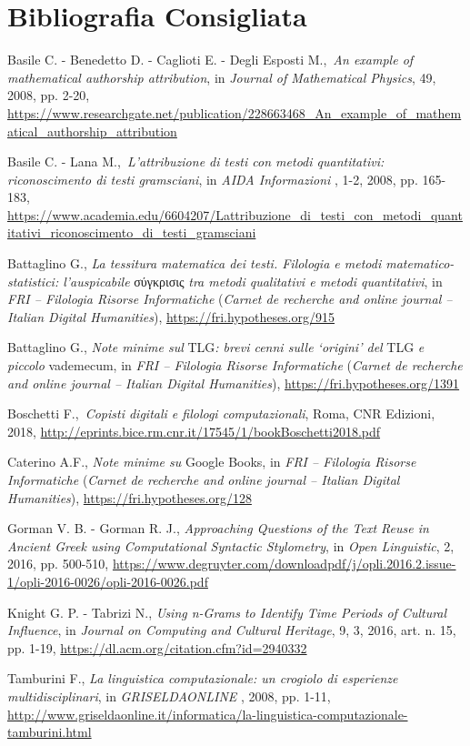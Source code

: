 \section*{Bibliografia Consigliata}
{\parindent0pt 
Basile C. - Benedetto D. - Caglioti E. - Degli Esposti M.,~\emph{An
example of mathematical authorship attribution}, in \emph{Journal of
Mathematical Physics}, 49, 2008, pp. 2-20,
\url{https://www.researchgate.net/publication/228663468_An_example_of_mathematical_authorship_attribution}

Basile C. - Lana M.,~\emph{L'attribuzione di testi con metodi
quantitativi: riconoscimento di testi gramsciani}, in \emph{AIDA
Informazioni} , 1-2, 2008, pp. 165-183,
\url{https://www.academia.edu/6604207/Lattribuzione_di_testi_con_metodi_quantitativi_riconoscimento_di_testi_gramsciani}

Battaglino G., \emph{La tessitura matematica dei testi. Filologia e
metodi matematico-statistici: l'auspicabile} σύγκρισις \emph{tra metodi
qualitativi e metodi quantitativi}, in \emph{FRI -- Filologia Risorse
Informatiche} (\emph{Carnet de recherche and online journal -- Italian
Digital Humanities}),
\url{https://fri.hypotheses.org/915}

Battaglino G., \emph{Note minime sul} TLG\emph{: brevi cenni sulle
`origini' del} TLG \emph{e piccolo} vademecum, in \emph{FRI -- Filologia
Risorse Informatiche} (\emph{Carnet de recherche and online journal --
Italian Digital Humanities}),
\url{https://fri.hypotheses.org/1391}

Boschetti F.,~\emph{Copisti digitali e filologi computazionali}, Roma,
CNR Edizioni, 2018,
\url{http://eprints.bice.rm.cnr.it/17545/1/bookBoschetti2018.pdf} 

Caterino A.F., \emph{Note minime su} Google Books, in \emph{FRI --
Filologia Risorse Informatiche} (\emph{Carnet de recherche and online
journal -- Italian Digital Humanities}),
\url{https://fri.hypotheses.org/128}

Gorman V. B. - Gorman R. J., \emph{Approaching Questions of the Text
Reuse in Ancient Greek using Computational Syntactic Stylometry}, in
\emph{Open Linguistic}, 2, 2016, pp. 500-510,
\url{https://www.degruyter.com/downloadpdf/j/opli.2016.2.issue-1/opli-2016-0026/opli-2016-0026.pdf}

Knight G. P. - Tabrizi N., \emph{Using n-Grams to Identify Time Periods
of Cultural Influence}, in \emph{Journal on Computing and Cultural
Heritage}, 9, 3, 2016, art. n. 15, pp. 1-19,
\url{https://dl.acm.org/citation.cfm?id=2940332}

Tamburini F., \emph{La linguistica computazionale: un crogiolo di
esperienze multidisciplinari}, in \emph{GRISELDAONLINE} , 2008, pp.
1-11,
\url{http://www.griseldaonline.it/informatica/la-linguistica-computazionale-tamburini.html}
}

